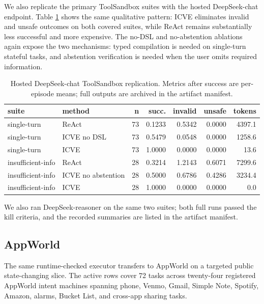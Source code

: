 \documentclass[11pt]{article}
\newcommand{\icve}{ICVE\xspace}
\begin{document}
We also replicate the primary ToolSandbox suites with the hosted DeepSeek-chat endpoint.
Table \ref{tab:deepseek-replication} shows the same qualitative pattern: ICVE eliminates
invalid and unsafe outcomes on both covered suites, while ReAct remains substantially less
successful and more expensive. The no-DSL and
no-abstention ablations again expose the two mechanisms: typed compilation is needed on
single-turn stateful tasks, and abstention verification is needed when the user omits
required information.

\begin{table}[t]
\centering
\scriptsize
\setlength{\tabcolsep}{4pt}
\begin{tabular}{llrrrrr}
\toprule
suite & method & n & succ. & invalid & unsafe & tokens \\
\midrule
single-turn & ReAct & 73 & 0.1233 & 0.5342 & 0.0000 & 4397.1 \\
single-turn & ICVE no DSL & 73 & 0.5479 & 0.0548 & 0.0000 & 1258.6 \\
single-turn & \icve & 73 & 1.0000 & 0.0000 & 0.0000 & 13.6 \\
insufficient-info & ReAct & 28 & 0.3214 & 1.2143 & 0.6071 & 7299.6 \\
insufficient-info & ICVE no abstention & 28 & 0.5000 & 0.6786 & 0.4286 & 3234.4 \\
insufficient-info & \icve & 28 & 1.0000 & 0.0000 & 0.0000 & 0.0 \\
\bottomrule
\end{tabular}
\caption{Hosted DeepSeek-chat ToolSandbox replication. Metrics after success are
per-episode means; full outputs are archived in the artifact manifest.}
\label{tab:deepseek-replication}
\end{table}

We also ran DeepSeek-reasoner on the same two suites; both full runs passed the kill
criteria, and the recorded summaries are listed in the artifact manifest.

\subsection{AppWorld}

The same runtime-checked executor transfers to AppWorld on a targeted public state-changing
slice. The active rows cover 72 tasks across twenty-four registered AppWorld
intent machines spanning phone, Venmo, Gmail, Simple Note, Spotify, Amazon, alarms,
Bucket List, and cross-app sharing tasks.
\end{document}
